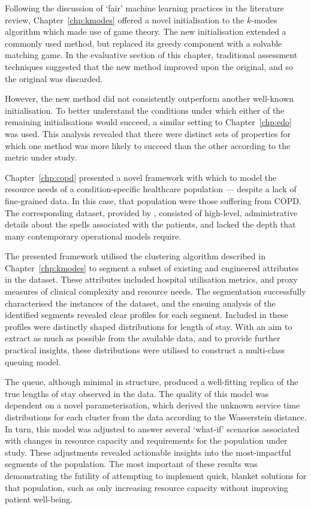 Following the discussion of `fair' machine learning practices in the literature
review, Chapter~\ref{chp:kmodes} offered a novel initialisation to the
\(k\)-modes algorithm which made use of game theory. The new initialisation
extended a commonly used method, but replaced its greedy component with a
solvable matching game. In the evaluative section of this chapter, traditional
assessment techniques suggested that the new method improved upon the original,
and so the original was discarded.

However, the new method did not consistently outperform another well-known
initialisation. To better understand the conditions under which either of the
remaining initialisations would succeed, a similar setting to
Chapter~\ref{chp:edo} was used. This analysis revealed that there were distinct
sets of properties for which one method was more likely to succeed than the
other according to the metric under study.

Chapter~\ref{chp:copd} presented a novel framework with which to model the
resource needs of a condition-specific healthcare population --- despite a lack
of fine-grained data. In this case, that population were those suffering from
COPD. The corresponding dataset, provided by \ctmuhb, consisted of high-level,
administrative details about the spells associated with the patients, and lacked
the depth that many contemporary operational models require.

The presented framework utilised the clustering algorithm described in
Chapter~\ref{chp:kmodes} to segment a subset of existing and engineered
attributes in the dataset. These attributes included hospital utilisation
metrics, and proxy measures of clinical complexity and resource needs. The
segmentation successfully characterised the instances of the dataset, and the
ensuing analysis of the identified segments revealed clear profiles for each
segment. Included in these profiles were distinctly shaped distributions for
length of stay. With an aim to extract as much as possible from the available
data, and to provide further practical insights, these distributions were
utilised to construct a multi-class queuing model.

The queue, although minimal in structure, produced a well-fitting replica of the
true lengths of stay observed in the data. The quality of this model was
dependent on a novel parameterisation, which derived the unknown service time
distributions for each cluster from the data according to the Wasserstein
distance. In turn, this model was adjusted to answer several `what-if' scenarios
associated with changes in resource capacity and requirements for the population
under study. These adjustments revealed actionable insights into the
most-impactful segments of the population. The most important of these results
was demonstrating the futility of attempting to implement quick, blanket
solutions for that population, such as only increasing resource capacity without
improving patient well-being.



